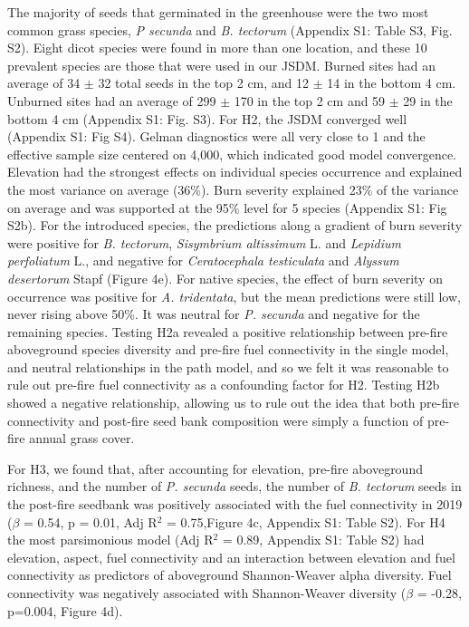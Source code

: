 \documentclass[
  12pt,
]{article}
\begin{document}
The majority of seeds that germinated in the greenhouse were the two
most common grass species, \emph{P secunda} and \emph{B. tectorum}
(Appendix S1: Table S3, Fig. S2). Eight dicot species were found in more
than one location, and these 10 prevalent species are those that were
used in our JSDM. Burned sites had an average of 34 \(\pm\) 32 total
seeds in the top 2 cm, and 12 \(\pm\) 14 in the bottom 4 cm. Unburned
sites had an average of 299 \(\pm\) 170 in the top 2 cm and 59 \(\pm\)
29 in the bottom 4 cm (Appendix S1: Fig. S3). For H2, the JSDM converged
well (Appendix S1: Fig S4). Gelman diagnostics were all very close to 1
and the effective sample size centered on 4,000, which indicated good
model convergence. Elevation had the strongest effects on individual
species occurrence and explained the most variance on average (36\%).
Burn severity explained 23\% of the variance on average and was
supported at the 95\% level for 5 species (Appendix S1: Fig S2b). For
the introduced species, the predictions along a gradient of burn
severity were positive for \emph{B. tectorum}, \emph{Sisymbrium
altissimum} L. and \emph{Lepidium perfoliatum} L., and negative for
\emph{Ceratocephala testiculata} and \emph{Alyssum desertorum} Stapf
(Figure 4e). For native species, the effect of burn severity on
occurrence was positive for \emph{A. tridentata}, but the mean
predictions were still low, never rising above 50\%. It was neutral for
\emph{P. secunda} and negative for the remaining species. Testing H2a
revealed a positive relationship between pre-fire aboveground species
diversity and pre-fire fuel connectivity in the single model, and
neutral relationships in the path model, and so we felt it was
reasonable to rule out pre-fire fuel connectivity as a confounding
factor for H2. Testing H2b showed a negative relationship, allowing us
to rule out the idea that both pre-fire connectivity and post-fire seed
bank composition were simply a function of pre-fire annual grass cover.

For H3, we found that, after accounting for elevation, pre-fire
aboveground richness, and the number of \emph{P. secunda} seeds, the
number of \emph{B. tectorum} seeds in the post-fire seedbank was
positively associated with the fuel connectivity in 2019 (\(\beta\) =
0.54, p = 0.01, Adj R\(^2\) = 0.75,Figure 4c, Appendix S1: Table S2).
For H4 the most parsimonious model (Adj R\(^2\) = 0.89, Appendix S1:
Table S2) had elevation, aspect, fuel connectivity and an interaction
between elevation and fuel connectivity as predictors of aboveground
Shannon-Weaver alpha diversity. Fuel connectivity was negatively
associated with Shannon-Weaver diversity (\(\beta\) = -0.28, p=0.004,
Figure 4d).
\end{document}
